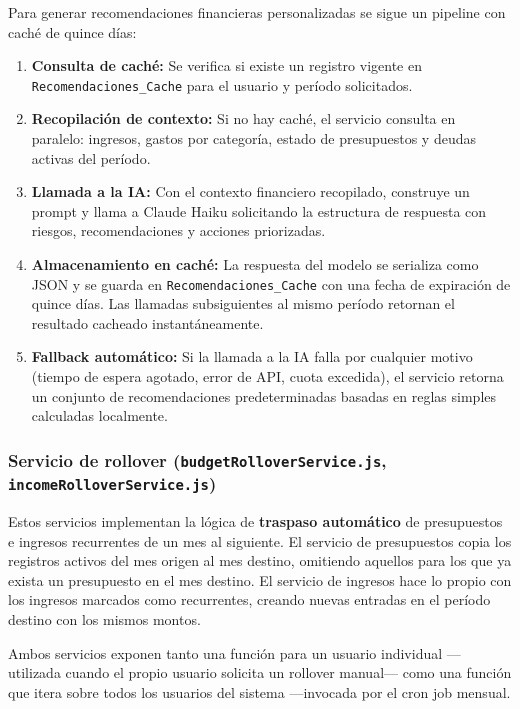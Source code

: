 \label{sec:srv-recomendaciones}

Para generar recomendaciones financieras personalizadas se sigue un
pipeline con caché de quince días:

\begin{enumerate}
  \item \textbf{Consulta de caché:} Se verifica si existe un registro
    vigente en \texttt{Recomendaciones\_Cache} para el usuario y
    período solicitados.
  \item \textbf{Recopilación de contexto:} Si no hay caché, el servicio
    consulta en paralelo: ingresos, gastos por categoría, estado de
    presupuestos y deudas activas del período.
  \item \textbf{Llamada a la IA:} Con el contexto financiero
    recopilado, construye un prompt y llama a Claude Haiku
    solicitando la estructura de respuesta con riesgos,
    recomendaciones y acciones priorizadas.
  \item \textbf{Almacenamiento en caché:} La respuesta del modelo se
    serializa como JSON y se guarda en \texttt{Recomendaciones\_Cache}
    con una fecha de expiración de quince días. Las llamadas
    subsiguientes al mismo período retornan el resultado cacheado
    instantáneamente.
  \item \textbf{Fallback automático:} Si la llamada a la IA falla por
    cualquier motivo (tiempo de espera agotado, error de API, cuota
    excedida), el servicio retorna un conjunto de recomendaciones
    predeterminadas basadas en reglas simples calculadas localmente.
\end{enumerate}

\subsubsection{Servicio de rollover (\texttt{budgetRolloverService.js},
  \texttt{incomeRolloverService.js})}

Estos servicios implementan la lógica de \textbf{traspaso automático}
de presupuestos e ingresos recurrentes de un mes al siguiente. El
servicio de presupuestos copia los registros activos del mes origen al
mes destino, omitiendo aquellos para los que ya exista un presupuesto
en el mes destino. El servicio de ingresos hace lo propio con los
ingresos marcados como recurrentes, creando nuevas entradas en el
período destino con los mismos montos.

Ambos servicios exponen tanto una función para un usuario individual
—utilizada cuando el propio usuario solicita un rollover manual— como
una función que itera sobre todos los usuarios del sistema —invocada
por el cron job mensual.

